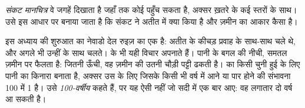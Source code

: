 \begin{definition}[संकट मानचित्र]\label{def:g9:natural-risks:hazard-map}
\emph{संकट मानचित्र} वे जगहें दिखाता है जहाँ तक कोई  पहुँच सकता है, अक्सर ख़तरे के कई स्तरों के साथ। उसे इस आधार पर बनाया जाता है कि
संकट ने अतीत में क्या किया है और ज़मीन का आकार कैसा है।
\end{definition}

इस अध्याय की शुरुआत का नेवाडो देल रुइज़ का  एक  है: अतीत के कीचड़
प्रवाह  के साथ-साथ चले थे, और अगले भी उन्हीं के साथ चलते।  के  भी यही
विचार अपनाते हैं। पानी  के बगल की नीची, समतल ज़मीन पर फैलता है:  जितनी ऊँची, वह
ज़मीन की उतनी चौड़ी पट्टी ढकती है।  का  किसी चुनी हुई  के लिए पानी का किनारा
बनाता है, अक्सर उस  के लिए जिसके किसी भी वर्ष में आने या पार होने की संभावना 100 में
1 है। उसे \emph{100-वर्षीय } कहते हैं, पर यह ऐसी  नहीं जो सदी में एक बार आए:
वह लगातार दो वर्ष आ सकती
है।

